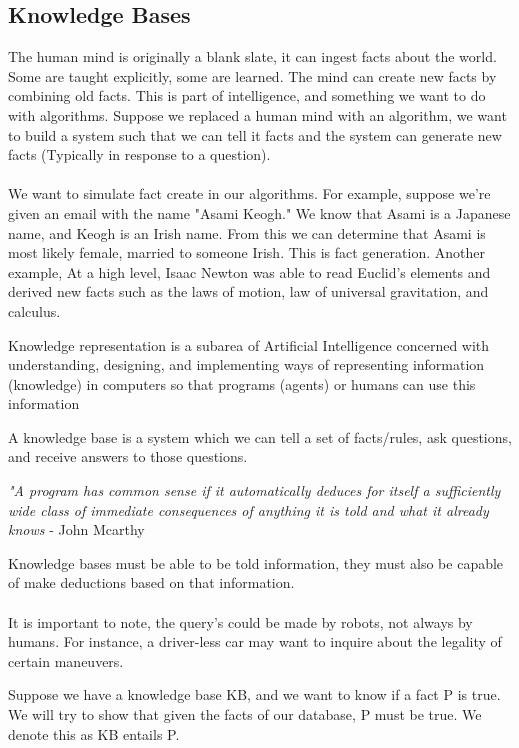\documentclass{chezarticle}
\begin{document}
\subsection{Knowledge Bases}
The human mind is originally a blank slate, it can ingest facts about the world. Some are taught explicitly, some are learned. The mind can create new facts by combining old facts. This is part of intelligence, and something we want to do with algorithms. Suppose we replaced a human mind with an algorithm, we want to build a system such that we can tell it facts and the system can generate new facts (Typically in response to a question). \\
\\
We want to simulate fact create in our algorithms. For example, suppose we're given an email with the name "Asami Keogh." We know that Asami is a Japanese name, and Keogh is an Irish name. From this we can determine that Asami is most likely female, married to someone Irish. This is fact generation. Another example, At a high level, Isaac Newton was able to read Euclid's elements and derived new facts such as the laws of motion, law of universal gravitation, and calculus.
\begin{definition}
Knowledge representation is a subarea of Artificial Intelligence concerned with understanding, designing, and implementing ways of representing information (knowledge) in computers so that programs (agents) or humans can use this information
\end{definition}
\begin{definition}
A knowledge base is a system which we can tell a set of facts/rules, ask questions, and receive answers to those questions.
\end{definition}
\begin{note}
\textit{"A program has common sense if it automatically deduces for itself a sufficiently wide class of immediate consequences of anything it is told and what it already knows} - John Mcarthy
\end{note}
Knowledge bases must be able to be told information, they must also be capable of make deductions based on that information. \\
\\
It is important to note, the query's could be made by robots, not always by humans. For instance, a driver-less car may want to inquire about the legality of certain maneuvers. 
\begin{proposition}
Suppose we have a knowledge base KB, and we want to know if a fact P is true. We will try to show that given the facts of our database, P must be true. We denote this as KB entails P.
\end{proposition}
\end{document}
